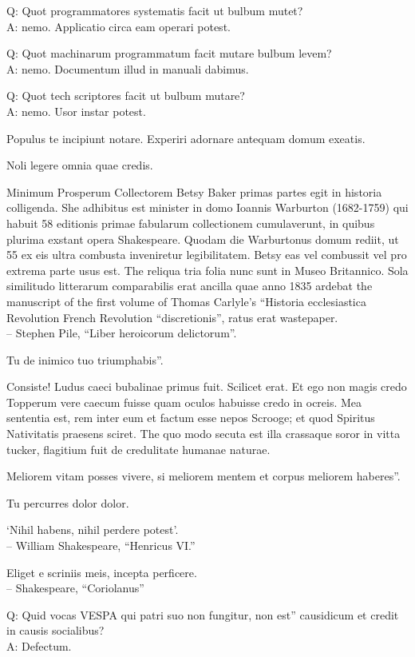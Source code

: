 \documentclass[titlepage,12pt]{memoir}
\begin{document}
Q: Quot programmatores systematis facit ut bulbum mutet?\\
A: nemo. Applicatio circa eam operari potest.

Q: Quot machinarum programmatum facit mutare bulbum levem?\\
A: nemo. Documentum illud in manuali dabimus.

Q: Quot tech scriptores facit ut bulbum mutare?\\
A: nemo. Usor instar potest.

Populus te incipiunt notare. Experiri adornare antequam domum exeatis.

Noli legere omnia quae credis.

Minimum Prosperum Collectorem
Betsy Baker primas partes egit in historia colligenda. She
adhibitus est minister in domo Ioannis Warburton (1682-1759) qui habuit
58 editionis primae fabularum collectionem cumulaverunt, in quibus plurima exstant
opera Shakespeare.
Quodam die Warburtonus domum rediit, ut 55 ex eis ultra combusta inveniretur
legibilitatem. Betsy eas vel combussit vel pro extrema parte usus est. The
reliqua tria folia nunc sunt in Museo Britannico.
Sola similitudo litterarum comparabilis erat ancilla quae anno 1835 ardebat
the manuscript of the first volume of Thomas Carlyle’s “Historia ecclesiastica
Revolution French Revolution “discretionis”, ratus erat wastepaper.
\\-- Stephen Pile, “Liber heroicorum delictorum”.

Tu de inimico tuo triumphabis”.

Consiste! Ludus caeci bubalinae primus fuit. Scilicet erat.
Et ego non magis credo Topperum vere caecum fuisse quam oculos habuisse credo
in ocreis. Mea sententia est, rem inter eum et factum esse
nepos Scrooge; et quod Spiritus Nativitatis praesens sciret. The
quo modo secuta est illa crassaque soror in vitta tucker, flagitium fuit
de credulitate humanae naturae.

Meliorem vitam posses vivere, si meliorem mentem et corpus meliorem haberes”.

Tu percurres dolor dolor.

‘Nihil habens, nihil perdere potest’.
\\-- William Shakespeare, “Henricus VI.”

Eliget e scriniis meis, incepta perficere.
\\-- Shakespeare, “Coriolanus”

Q: Quid vocas VESPA qui patri suo non fungitur, non est”
causidicum et credit in causis socialibus?\\
A: Defectum.
\end{document}
